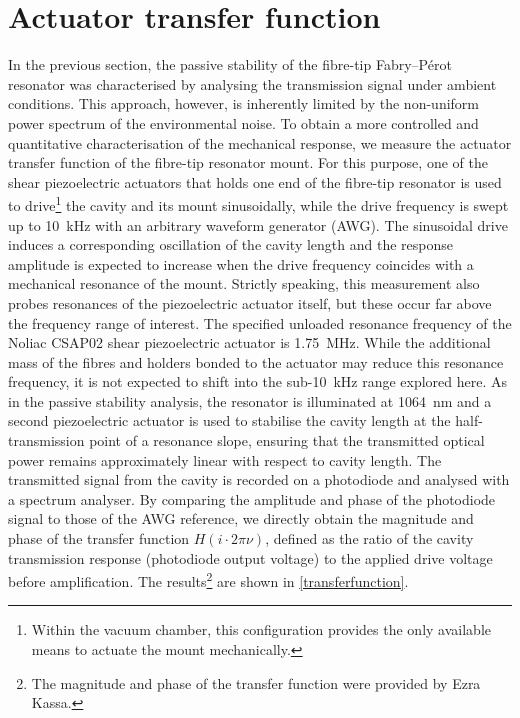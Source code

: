 \documentclass[../Thesis-IJspeert.tex]{subfiles}
\begin{document}
\section{Actuator transfer function}
In the previous section, the passive stability of the fibre-tip Fabry--Pérot resonator was characterised by analysing the transmission signal under ambient conditions. This approach, however, is inherently limited by the non-uniform power spectrum of the environmental noise. To obtain a more controlled and quantitative characterisation of the mechanical response, we measure the actuator transfer function of the fibre-tip resonator mount. For this purpose, one of the shear piezoelectric actuators that holds one end of the fibre-tip resonator is used to drive\footnote{Within the vacuum chamber, this configuration provides the only available means to actuate the mount mechanically.} the cavity and its mount sinusoidally, while the drive frequency is swept up to \SI{10}{\kilo\hertz} with an arbitrary waveform generator (AWG). The sinusoidal drive induces a corresponding oscillation of the cavity length and the response amplitude is expected to increase when the drive frequency coincides with a mechanical resonance of the mount. Strictly speaking, this measurement also probes resonances of the piezoelectric actuator itself, but these occur far above the frequency range of interest. The specified unloaded resonance frequency of the Noliac CSAP02 shear piezoelectric actuator is \SI{1.75}{\mega\hertz}. While the additional mass of the fibres and holders bonded to the actuator may reduce this resonance frequency, it is not expected to shift into the sub-\SI{10}{\kilo\hertz} range explored here. As in the passive stability analysis, the resonator is illuminated at \SI{1064}{\nano\meter} and a second piezoelectric actuator is used to stabilise the cavity length at the half-transmission point of a resonance slope, ensuring that the transmitted optical power remains approximately linear with respect to cavity length. The transmitted signal from the cavity is recorded on a photodiode and analysed with a spectrum analyser. By comparing the amplitude and phase of the photodiode signal to those of the AWG reference, we directly obtain the magnitude and phase of the transfer function $H(i\cdot 2\pi\nu)$, defined as the ratio of the cavity transmission response (photodiode output voltage) to the applied drive voltage before amplification. The results\footnote{The magnitude and phase of the transfer function were provided by Ezra Kassa.} are shown in \autoref{transferfunction}.
\end{document}
